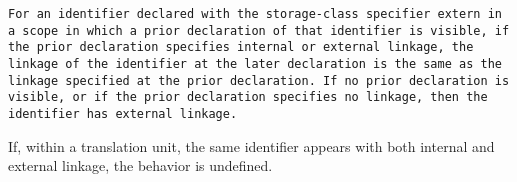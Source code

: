 {\tt For an identifier declared with the storage-class specifier extern in a scope 
in which a prior declaration of that identifier is visible, if the prior 
declaration specifies internal or external linkage, the linkage of the 
identifier at the later declaration is the same as the linkage specified 
at the prior declaration. If no prior declaration is visible, or if the 
prior declaration specifies no linkage, then the identifier has external 
linkage.

If, within a translation unit, the same identifier appears with both internal 
and external linkage, the behavior is undefined.}
